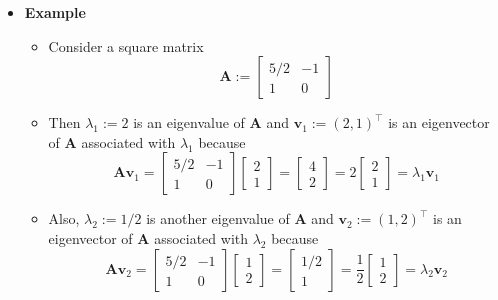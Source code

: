 \documentclass[12pt,a4paper]{article}
\begin{document}
\begin{itemize}
\clearpage
\item \textbf{Example}
  \begin{itemize}
  \item Consider a square matrix
    \begin{equation}\nonumber%
      \bm{A} :=
      \begin{bmatrix}
        5/2 & -1 \\
        1 & 0
      \end{bmatrix}
    \end{equation}
  \item Then
    $\lambda_{1}:=2$ is an eigenvalue of $\bm{A}$
    and $\bm{v}_{1}:=(2, 1)^{\top}$ is an eigenvector of $\bm{A}$ associated with $\lambda_{1}$
    because
    \begin{equation}\nonumber%
      \bm{A}
      \bm{v}_{1}
      = 
      \begin{bmatrix}
        5/2 & -1 \\
        1 & 0
      \end{bmatrix}
      \begin{bmatrix}
        2 \\
        1
      \end{bmatrix}
      = 
      \begin{bmatrix}
        4 \\
        2
      \end{bmatrix}
      = 2
      \begin{bmatrix}
        2 \\
        1
      \end{bmatrix}
      = \lambda_{1}\bm{v}_{1}
    \end{equation}

  \item Also,
    $\lambda_{2}:=1/2$ is another eigenvalue of $\bm{A}$
    and $\bm{v}_{2}:=(1, 2)^{\top}$ is an eigenvector of $\bm{A}$ associated with $\lambda_{2}$
    because
    \begin{equation}\nonumber%
      \bm{A}
      \bm{v}_{2}
      = 
      \begin{bmatrix}
        5/2 & -1 \\
        1 & 0
      \end{bmatrix}
      \begin{bmatrix}
        1 \\
        2
      \end{bmatrix}
      = 
      \begin{bmatrix}
        1/2 \\
        1
      \end{bmatrix}
      = \frac{1}{2}
      \begin{bmatrix}
        1 \\
        2
      \end{bmatrix}
      = \lambda_{2}\bm{v}_{2}
    \end{equation}
  \end{itemize}

\end{itemize}
\end{document}
